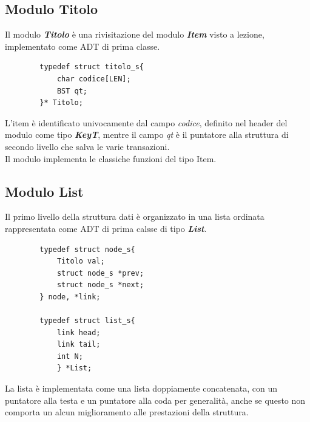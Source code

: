 \documentclass[11pt, a4paper, oneside, titlepage]{article}
\begin{document}
    \subsection{Modulo Titolo}
    Il modulo \textbf{\textit{Titolo}} è una rivisitazione del modulo \textbf{\textit{Item}} visto a lezione, implementato come ADT di prima classe.
    \begin{lstlisting}
        typedef struct titolo_s{
            char codice[LEN];
            BST qt;
        }* Titolo;
    \end{lstlisting}
    L'item è identificato univocamente dal campo \textit{codice}, definito nel header del modulo come tipo \textbf{\textit{KeyT}}, 
    mentre il campo \textit{qt} è il puntatore alla struttura di secondo livello che salva le varie transazioni.\\
    Il modulo implementa le classiche funzioni del tipo Item.
    
    \subsection{Modulo List}
    Il primo livello della struttura dati è organizzato in una lista ordinata rappresentata come ADT di prima calsse di tipo \textbf{\textit{List}}.
    \begin{lstlisting}
        typedef struct node_s{
            Titolo val;
            struct node_s *prev;
            struct node_s *next;
        } node, *link;
        
        typedef struct list_s{
            link head;
            link tail;
            int N;
            } *List;
        \end{lstlisting}
        La lista è implementata come una lista doppiamente concatenata, con un puntatore alla testa e un puntatore alla coda per generalità, 
        anche se questo non comporta un alcun miglioramento alle prestazioni della struttura.
\end{document}
